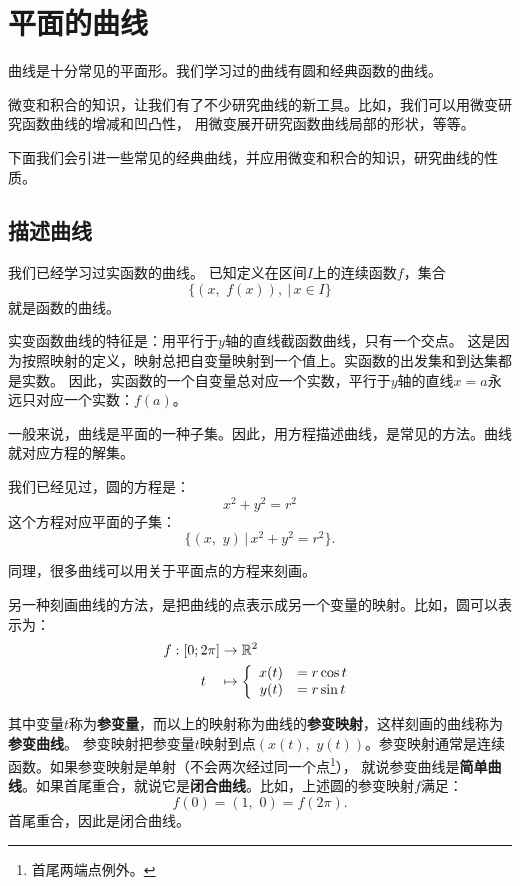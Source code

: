 \documentclass[12pt,UTF8]{ctexbook}
\begin{document}
\chapter{平面的曲线}

曲线是十分常见的平面形。我们学习过的曲线有圆和经典函数的曲线。

微变和积合的知识，让我们有了不少研究曲线的新工具。比如，我们可以用微变研究函数曲线的增减和凹凸性，
用微变展开研究函数曲线局部的形状，等等。

下面我们会引进一些常见的经典曲线，并应用微变和积合的知识，研究曲线的性质。

\section{描述曲线}

我们已经学习过实函数的曲线。
已知定义在区间$I$上的连续函数$f$，集合
$$ \{(x,\,\,f(x)) ,\ | \, x\in I\}$$
就是函数的曲线。

实变函数曲线的特征是：用平行于$y$轴的直线截函数曲线，只有一个交点。
这是因为按照映射的定义，映射总把自变量映射到一个值上。实函数的出发集和到达集都是实数。
因此，实函数的一个自变量总对应一个实数，平行于$y$轴的直线$x = a$永远只对应一个实数：$f(a)$。

一般来说，曲线是平面的一种子集。因此，用方程描述曲线，是常见的方法。曲线就对应方程的解集。

我们已经见过，圆的方程是：
$$ x^2 + y^2 = r^2 $$
这个方程对应平面的子集：
$$ \{(x,\,\,y ) \, | \, x^2 + y^2 = r^2 \}.$$

同理，很多曲线可以用关于平面点的方程来刻画。

另一种刻画曲线的方法，是把曲线的点表示成另一个变量的映射。比如，圆可以表示为：
\begin{align*}
    f: [0;2\pi] &\rightarrow \mathbb{R}^2 \\
    t\quad &\mapsto\left\{
        \begin{array}[]{rl}
            x(t) &= r\cos{t} \\
            y(t) &= r\sin{t} \\
        \end{array}
    \right.
\end{align*}

其中变量$t$称为\textbf{参变量}，而以上的映射称为曲线的\textbf{参变映射}，这样刻画的曲线称为\textbf{参变曲线}。
参变映射把参变量$t$映射到点$(x(t),\,\, y(t))$。参变映射通常是连续函数。如果参变映射是单射（不会两次经过同一个点\footnote{首尾两端点例外。}），
就说参变曲线是\textbf{简单曲线}。如果首尾重合，就说它是\textbf{闭合曲线}。比如，上述圆的参变映射$f$满足：
$$ f(0) =  (1, \,\,0) = f(2\pi). $$
首尾重合，因此是闭合曲线。
\end{document}
